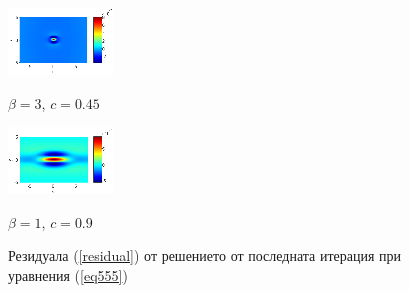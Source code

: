 \documentclass{article}
\newcommand{\rf}[1]{(\ref{#1})}
\begin{document}
\begin{figure}[htbp]
	\begin{minipage}[b]{0.5\linewidth}
		 \centering
		\includegraphics[width=\linewidth]{../EllipticEquationSJC/residual/residual_bt5c03.eps}
		\centerline{$\beta = 3$, $c = 0.45$}
	\end{minipage}	
	\begin{minipage}[b]{0.5\linewidth}
		\centering
		 \includegraphics[width=\linewidth]{../EllipticEquationSJC/residual/residual_bt1c09.eps}
	\centerline{$\beta = 1$, $c = 0.9$ }
	\end{minipage}
		\caption{Резидуала \rf{residual} от решението от последната итерация при уравнения \rf{eq555} }
		\label{resid}
\end{figure}
\FloatBarrier
\end{document}
